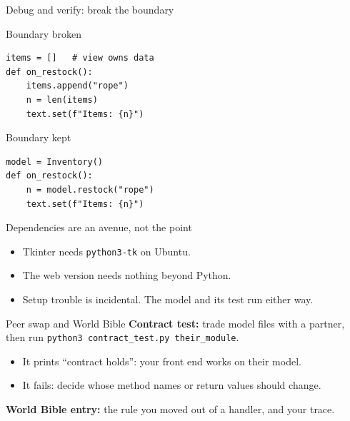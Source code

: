 \documentclass[aspectratio=169]{beamer}
\begin{document}
\begin{frame}[fragile]{Debug and verify: break the boundary}
\begin{comparebody}
  \begin{compareleft}{Boundary broken}
\begin{lstlisting}
items = []   # view owns data
def on_restock():
    items.append("rope")
    n = len(items)
    text.set(f"Items: {n}")
\end{lstlisting}
  \end{compareleft}
  \begin{compareright}{Boundary kept}
\begin{lstlisting}
model = Inventory()
def on_restock():
    n = model.restock("rope")
    text.set(f"Items: {n}")
\end{lstlisting}
  \end{compareright}
\end{comparebody}
\end{frame}

\begin{frame}{Dependencies are an avenue, not the point}
  \begin{itemize}
    \item Tkinter needs \texttt{python3-tk} on Ubuntu.
    \item The web version needs nothing beyond Python.
    \item Setup trouble is incidental. The model and its test run either way.
  \end{itemize}
\end{frame}

\begin{designdecisionframe}{Peer swap and World Bible}
  \textbf{Contract test:} trade model files with a partner, then run \texttt{python3 contract\_test.py their\_module}.
  \begin{itemize}
    \item It prints ``contract holds'': your front end works on their model.
    \item It fails: decide whose method names or return values should change.
  \end{itemize}
  \textbf{World Bible entry:} the rule you moved out of a handler, and your trace.
\end{designdecisionframe}
\end{document}

